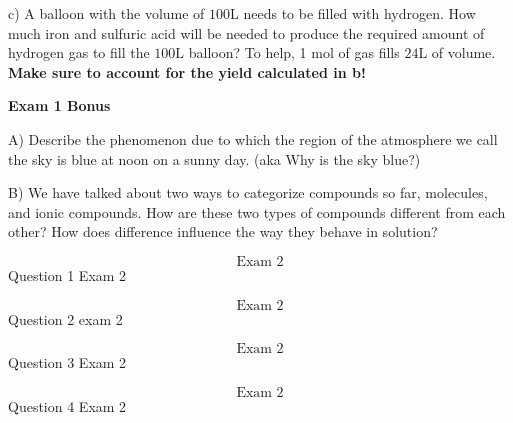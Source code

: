 \documentclass{article}
\begin{document}
    c) A balloon with the volume of $100 \si{\liter}$ needs to be filled with hydrogen. How much iron and sulfuric acid will be needed to produce the required amount of hydrogen gas to fill the $100 \si{\liter}$ balloon? To help, 1 $\si{\mole}$ of gas fills $24 \si{\liter}$ of volume. \textbf{Make sure to account for the yield calculated in b!}

    \pagebreak

    \begin{center}
        \textbf{Exam 1 Bonus}\\
    \end{center}

    A) Describe the phenomenon due to which the region of the atmosphere we call the sky is blue at noon on a sunny day. (aka Why is the sky blue?)

    B) We have talked about two ways to categorize compounds so far, molecules, and ionic compounds. How are these two types of compounds different from each other? How does difference influence the way they behave in solution? 
    \pagebreak


    $$\text{Exam 2}$$
    Question 1 Exam 2
    \pagebreak

    $$\text{Exam 2}$$
    Question 2 exam 2
    \pagebreak

    $$\text{Exam 2}$$
    Question 3 Exam 2
    \pagebreak


    $$\text{Exam 2}$$
    Question 4 Exam 2
    \pagebreak

\end{document}
